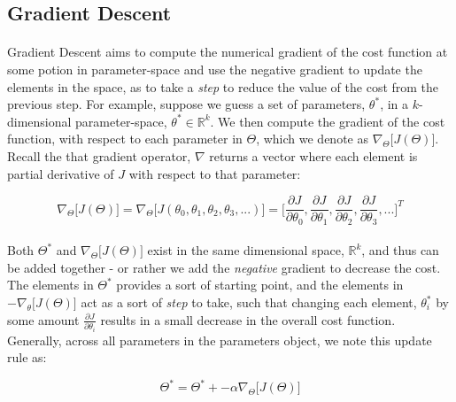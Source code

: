 \documentclass[12pt,letterpaper]{article}
\begin{document}
\subsection{Gradient Descent}

\paragraph*{}Gradient Descent aims to compute the numerical gradient of the cost function at some potion in parameter-space and use the negative gradient to update the elements in the space, as to take a \textit{step} to reduce the value of the cost from the previous step. For example, suppose we guess a set of parameters, $\theta^*$, in a $k$-dimensional parameter-space, $\theta^* \in \mathbb{R}^k$. We then compute the gradient of the cost function, with respect to each parameter in $\Theta$, which we denote as $\nabla_\Theta \big[ J(\Theta) \big]$. Recall the that gradient operator, $\nabla$ returns a vector where each element is partial derivative of $J$ with respect to that parameter:

\begin{equation}
\label{cost gradient}
\nabla_\Theta \big[ J(\Theta) \big] = \nabla_\Theta \big[ J(\theta_0, \theta_1,\theta_2,\theta_3,...) \big] =
\Big[ \frac{\partial J}{\partial \theta_0}, \frac{\partial J}{\partial \theta_1}, 
		\frac{\partial J}{\partial \theta_2}, \frac{\partial J}{\partial \theta_3}, ... \Big]^T
\end{equation}

\paragraph*{}Both $\Theta^*$ and $\nabla_\Theta \big[ J(\Theta) \big]$ exist in the same dimensional space, $\mathbb{R}^k$, and thus can be added together - or rather we add the \textit{negative} gradient to decrease the cost. The elements in $\Theta^*$ provides a sort of starting point, and the elements in $-\nabla_\theta \big[ J(\Theta) \big]$ act as a sort of \textit{step} to take, such that changing each element, $\theta^*_i$ by some amount $\frac{\partial J}{\partial \theta_i}$ results in a small decrease in the overall cost function. Generally, across all parameters in the parameters object, we note this update rule as:

\begin{equation}
\label{gradient step}
\Theta^* = \Theta^* + -\alpha \nabla_\Theta \big[ J(\Theta) \big]
\end{equation}
\end{document}
